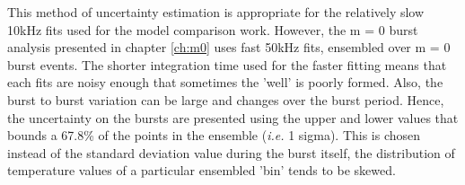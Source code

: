 This method of uncertainty estimation is appropriate for the relatively slow 10kHz fits used for the model comparison work. However, the m = 0 burst analysis presented in chapter \ref{ch:m0} uses fast 50kHz fits, ensembled over m = 0 burst events. The shorter integration time used for the faster fitting means that each fits are noisy enough that sometimes the \chisq 'well' is poorly formed. Also, the burst to burst variation can be large and changes over the burst period. Hence, the uncertainty on the bursts are presented using the upper and lower values that bounds a 67.8\% of the points in the ensemble (\textit{i.e.} 1 sigma). This is chosen instead of the standard deviation value during the burst itself, the distribution of temperature values of a particular ensembled 'bin' tends to be skewed. 